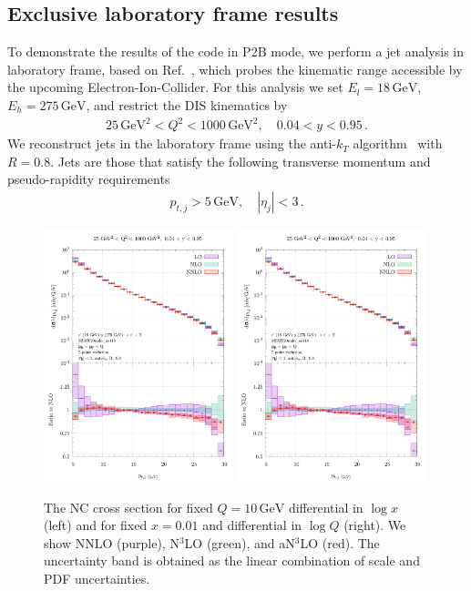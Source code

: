 \documentclass[submission, PhysCodeb]{SciPost}
\newcommand{\GEV}{\,\mathrm{GeV}}
\newcommand{\NNNLO}{N$^3$LO}
\begin{document}
\subsection{Exclusive laboratory frame results}
To demonstrate the results of the code in P2B mode, we perform a jet
analysis in laboratory frame, based on Ref.~\cite{Borsa:2022cap}, which
probes the kinematic range accessible by the upcoming
Electron-Ion-Collider. For this analysis we set $E_l=18\GEV$,
$E_h=275\GEV$, and restrict the DIS kinematics by
\begin{align}
  25\GEV^2 < Q^2 < 1000 \GEV^2, \quad 0.04 < y < 0.95\,.
\end{align}
We reconstruct jets in the laboratory frame using the anti-$k_T$
algorithm~\cite{Cacciari:2008gp} with $R=0.8$. Jets are those that
satisfy the following transverse momentum and pseudo-rapidity requirements
\begin{align}
  p_{t,j} > 5 \GEV, \quad |\eta_j| < 3\,.
\end{align}
\begin{figure}[tb!]
  \centering\includegraphics[width=0.49\textwidth,page=1]{../paper_runs/lab_frame/lab-frame.pdf}
  \centering\includegraphics[width=0.49\textwidth,page=2]{../paper_runs/lab_frame/lab-frame.pdf}
  \caption{The NC cross section for fixed $Q=10\GEV$ differential in
    $\log x$ (left) and for fixed $x=0.01$ and differential in $\log
    Q$ (right). We show NNLO (purple), \NNNLO{} (green), and a\NNNLO{}
    (red). The uncertainty band is obtained as the linear combination
    of scale and PDF uncertainties.}
  \label{fig:labframe}
\end{figure}
\end{document}
